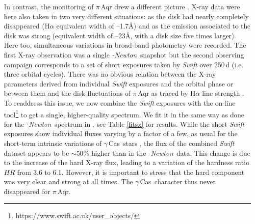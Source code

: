 \documentclass[a4paper,fleqn,usenatbib]{mnras}
\newcommand{\xmm}{{\sc{XMM}}\emph{-Newton}}
\newcommand{\gc}{$\gamma$\,Cas}
\begin{document}
In contrast, the monitoring of $\pi$\,Aqr drew a different picture \citep{naz19piaqr}. X-ray data were here also taken in two very different situations: as the disk had nearly completely disappeared (H$\alpha$ equivalent width of --1.7\AA) and as the emission associated to the disk was strong (equivalent width of --23\AA, with a disk size five times larger). Here too, simultaneous variations in broad-band photometry were recorded. The first X-ray observation was a single \xmm\ snapshot but the second observing campaign corresponds to a set of short exposures taken by {\it Swift} over 250\,d (i.e. three orbital cycles). There was no obvious relation between the X-ray parameters derived from individual {\it Swift} exposures and the orbital phase or between them and the disk fluctuations of $\pi$\,Aqr as traced by H$\alpha$ line strength \citep{naz19piaqr}. To readdress this issue, we now combine the {\it Swift} exposures with the on-line tool\footnote{https://www.swift.ac.uk/user\_objects/} to get a single, higher-quality spectrum. We fit it in the same way as done for the \xmm\ spectrum in \citet{naz18}, see Table \ref{fitsx} for results. While the short {\it Swift} exposures show individual fluxes varying by a factor of a few, as usual for the short-term intrinsic variations of \gc\ stars \citep{naz19piaqr}, the flux of the combined {\it Swift} dataset appears to be $\sim$50\% higher than in the \xmm\ data. This change is due to the increase of the hard X-ray flux, leading to a variation of the hardness ratio $HR$ from 3.6 to 6.1. However, it is important to stress that the hard component was very clear and strong at all times. The \gc\ character thus never disappeared for $\pi$\,Aqr.
\end{document}
